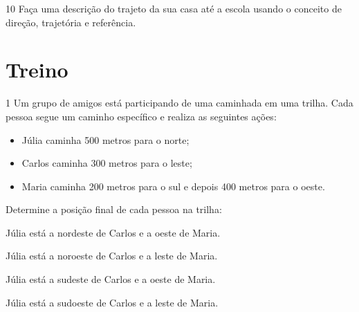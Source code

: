 \num{10} Faça uma descrição do trajeto da sua casa até a escola usando o
conceito de direção, trajetória e referência.


\section*{Treino}

\num{1} Um grupo de amigos está participando de uma caminhada em uma trilha.
Cada pessoa segue um caminho específico e realiza as seguintes ações:

\begin{itemize}
\item Júlia caminha 500 metros para o norte; 
\item Carlos caminha 300 metros para o leste; 
\item Maria caminha 200 metros para o sul e depois 400 metros para o oeste.
\end{itemize}

Determine a posição final de cada pessoa na trilha:

\begin{escolha}[itemsep=0pt]
\item
  Júlia está a nordeste de Carlos e a oeste de Maria.
\item
  Júlia está a noroeste de Carlos e a leste de Maria.
\item
  Júlia está a sudeste de Carlos e a oeste de Maria.
\item
  Júlia está a sudoeste de Carlos e a leste de Maria.
\end{escolha}



